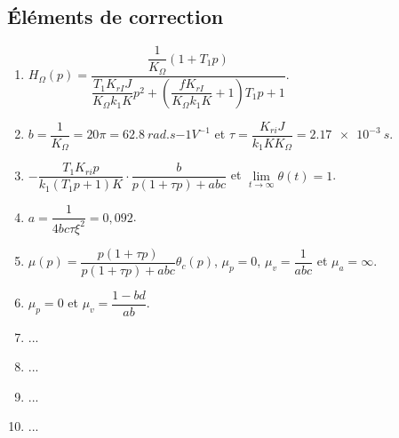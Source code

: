 \begin{multicols}{2}
\subsection*{Éléments de correction}
\begin{enumerate}
\item $H_{\Omega}(p)=\dfrac{\dfrac{1}{K_{\Omega}}\left( 1 + T_{1}p \right)}{\dfrac{T_{1} K_{rI}J}{K_{\Omega}k_{1}K}p^2+\left(\dfrac{f K_{rI}}{K_{\Omega}k_{1}K}+1\right)T_{1}p + 1 }$.
\item  $b=\dfrac{1}{K_{\Omega}} = 20 \pi = \SI{62,8}{rad.s{-1}V^{-1}}$ et $\tau=\dfrac{K_{ri}J}{k_1KK_{\Omega}}=\SI{2,17e-3}{s}$.
\item $-\dfrac{T_{1}K_{ri}p}{ k_{1}\left( T_{1}p + 1 \right)K}\cdot \dfrac{b}{p\left(1+\tau p \right)+abc}$ et $\lim\limits_{t\to\infty} \theta(t) = 1$.
\item  ${a}=\dfrac{1}{4bc\tau\xi^2}=0,092$.
\item $\mu(p)=\dfrac{p\left( 1+\tau p\right)}{p\left( 1+\tau p\right)+abc}\theta_c(p)$, $\mu_p = 0$, $\mu_v = \dfrac{1}{abc}$ et  $\mu_a = \infty$.
\item $\mu_p=0$ et $\mu_v= \dfrac{1 -bd}{ab}$.
\item ...
\item ...
\item ...
\item ...
\end{enumerate}
\fi


\ifprof
\else
\end{multicols}
\fi

%
%
%
%
%
%
